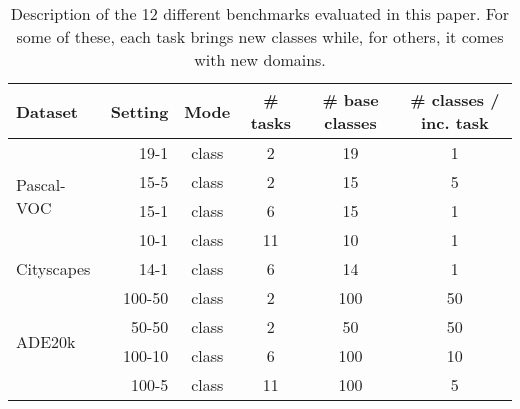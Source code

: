 \begin{table}[t]
    \centering
    \caption{Description of the 12 different benchmarks evaluated in this paper. For some of these, each task brings new classes while, for others, it comes with new domains.}
    \vspace*{-0.3cm}
    \label{tab:setting_description}
    \begin{tabular}{@{}l|rcccc@{}}
        \toprule
        {\scriptsize Dataset}       & {\scriptsize Setting} & {\scriptsize Mode} & {\scriptsize \# tasks} & {\scriptsize \# base classes} & {\scriptsize \# classes / inc. task} \\
        \midrule
        \multirow{4}{*}{Pascal-VOC} & 19-1                  & class              & 2                      & 19                            & 1                                    \\
                                    & 15-5                  & class              & 2                      & 15                            & 5                                    \\
                                    & 15-1                  & class              & 6                      & 15                            & 1                                    \\
                                    & 10-1                  & class              & 11                     & 10                            & 1                                    \\
        \hline
        \multirow{1}{*}{Cityscapes} & 14-1                  & class              & 6                      & 14                            & 1                                    \\
        \hline
        \multirow{4}{*}{ADE20k}     & 100-50                & class              & 2                      & 100                           & 50                                   \\
                                    & 50-50                 & class              & 2                      & 50                            & 50                                   \\
                                    & 100-10                & class              & 6                      & 100                           & 10                                   \\
                                    & 100-5                 & class              & 11                     & 100                           & 5                                    \\
        \bottomrule
    \end{tabular}
\end{table}

